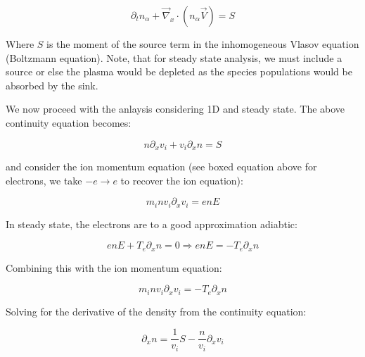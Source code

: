
$$\partial_t n_{\alpha} + \vec{\nabla}_x\cdot (n_{\alpha}\vec{V}) = S$$

Where $S$ is the moment of the source term in the inhomogeneous Vlasov equation (Boltzmann equation). Note, that for steady state analysis, we must include a source or else the plasma would be depleted as the species populations would be absorbed by the sink.

We now proceed with the anlaysis considering 1D and steady state. The above continuity equation becomes:

$$n\partial_x v_i + v_i \partial_x n = S$$

and consider the ion momentum equation (see boxed equation above for electrons, we take $-e \rightarrow e$ to recover the ion equation):

$$m_i nv_i \partial_x v_i = enE$$

In steady state, the electrons are to a good approximation adiabtic:

$$enE + T_e\partial_x n = 0 \Rightarrow enE = - T_e\partial_x n$$

Combining this with the ion momentum equation:

$$m_i nv_i \partial_x v_i = - T_e\partial_x n$$

Solving for the derivative of the density from the continuity equation: 

$$\partial_x n = \frac{1}{v_i}S - \frac{n}{v_i}\partial_x v_i$$





